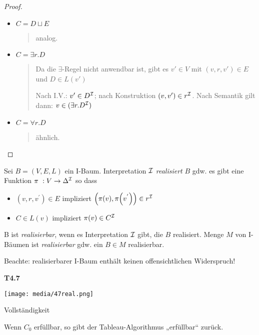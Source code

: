 \begin{proof}
\begin{itemize}
\item $C = D \sqcup E$

\begin{quote}
analog.
\end{quote}

\item $C = \exists r.D$

\begin{quote}
Da die $\exists$-Regel nicht anwendbar ist, gibt es $v'\in V$ mit $(v,r,v') \in E$ und $D \in L(v')$

Nach I.V.: $v' \in D^{\mathcal{I}}$; nach Konstruktion $(v,v') \in r^{\mathcal{I}}$. Nach Semantik gilt dann: $v \in (\exists r.D^{\mathcal{I}})$
\end{quote}

\item $C = \forall r.D$
\begin{quote}
ähnlich.
\end{quote}
\end{itemize}
\end{proof}

\begin{definition}[Realisierbarkeit]

Sei $B = \left( V,E,L \right)$ ein I-Baum. Interpretation $\mathcal{I}$
\emph{realisiert} $B$ gdw. es gibt eine Funktion
$\pi\ :V \rightarrow \Delta^{\mathcal{I}}$ so dass

\begin{itemize}
\item
  $\left( v,r,v^{'} \right) \in E$ impliziert
  $\left( \pi\left( v \right),\pi\left( v^{'} \right) \right) \in r^\MI$
\item
  $C \in L\left( v \right)$ impliziert
  $\pi\left( v \right) \in C^\MI$
\end{itemize}

B ist \emph{realisierbar}, wenn es Interpretation $\mathcal{I}$ gibt, die $B$
realisiert. Menge $M$ von I-Bäumen ist \emph{realisierbar} gdw. ein
$B \in M$ realisierbar.
\end{definition}

Beachte: realisierbarer I-Baum enthält keinen offensichtlichen Widerspruch!

\textbf{T4.7}

\texttt{[image: media/47real.png]}

\begin{proposition}{Vollständigkeit}

Wenn $C_{0}$ erfüllbar, so gibt der Tableau-Algorithmus „erfüllbar``
zurück.
\end{proposition}

